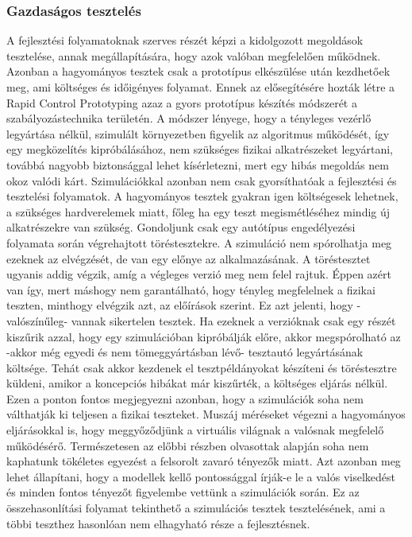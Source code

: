         \subsubsection{Gazdaságos tesztelés} \label{sec:gazdasagossag}
        A fejlesztési folyamatoknak szerves részét képzi a kidolgozott megoldások tesztelése, annak megállapítására, hogy azok valóban megfelelően működnek.
        Azonban a hagyományos tesztek csak a prototípus elkészülése után kezdhetőek meg, ami költséges és időigényes folyamat. Ennek az elősegítésére hozták létre a Rapid Control Prototyping azaz a gyors prototípus készítés módszerét a szabályozástechnika területén.
        A módszer lényege, hogy a tényleges vezérlő legyártása nélkül, szimulált környezetben figyelik az algoritmus működését, így egy megközelítés kipróbálásához, nem szükséges fizikai alkatrészeket legyártani, továbbá nagyobb biztonsággal lehet kísérletezni, mert egy hibás megoldás nem okoz valódi kárt.
        Szimulációkkal azonban nem csak gyorsíthatóak a fejlesztési és tesztelési folyamatok. A hagyományos tesztek gyakran igen költségesek lehetnek, a szükséges hardverelemek miatt, főleg ha egy teszt megismétléséhez mindig új alkatrészekre van szükség.
        Gondoljunk csak egy autótípus engedélyezési folyamata során végrehajtott töréstesztekre.
        A szimuláció nem spórolhatja meg ezeknek az elvégzését, de van egy előnye az alkalmazásának.
        A töréstesztet ugyanis addig végzik, amíg a végleges verzió meg nem felel rajtuk. Éppen azért van így, mert máshogy nem garantálható, hogy tényleg megfelelnek a fizikai teszten, minthogy elvégzik azt, az előírások szerint.
        Ez azt jelenti, hogy -valószínűleg- vannak sikertelen tesztek. Ha ezeknek a verzióknak csak egy részét kiszűrik azzal, hogy egy szimulációban kipróbálják előre, akkor megspórolható az -akkor még egyedi és nem tömeggyártásban lévő- tesztautó legyártásának költsége.
        Tehát csak akkor kezdenek el tesztpéldányokat készíteni és töréstesztre küldeni, amikor a koncepciós hibákat már kiszűrték, a költséges eljárás nélkül.
        Ezen a ponton fontos megjegyezni azonban, hogy a szimulációk soha nem válthatják ki teljesen a fizikai teszteket.
        Muszáj méréseket végezni a hagyományos eljárásokkal is, hogy meggyőződjünk a virtuális világnak a valósnak megfelelő működésérő. Természetesen az előbbi részben olvasottak alapján soha nem kaphatunk tökéletes egyezést a felsorolt zavaró tényezők miatt.
        Azt azonban meg lehet állapítani, hogy a modellek kellő pontossággal írják-e le a valós viselkedést és minden fontos tényezőt figyelembe vettünk a szimulációk során.
        Ez az összehasonlítási folyamat tekinthető a szimulációs tesztek tesztelésének, ami a többi teszthez hasonlóan nem elhagyható része a fejlesztésnek.

